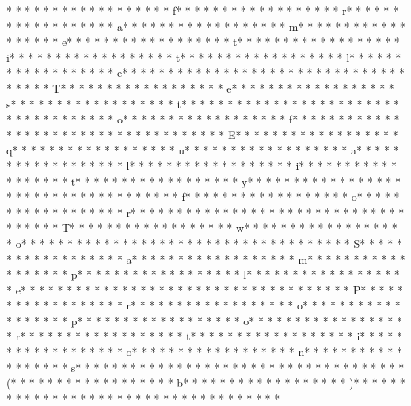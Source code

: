* * *  * * *  * * *  *  * * *  *  * * *  * f* * *  * * *  * * *  *  * * *  *  * * *  * r* * *  * * *  * * *  *  * * *  *  * * *  * a* * *  * * *  * * *  *  * * *  *  * * *  * m* * *  * * *  * * *  *  * * *  *  * * *  * e* * *  * * *  * * *  *  * * *  *  * * *  * t* * *  * * *  * * *  *  * * *  *  * * *  * i* * *  * * *  * * *  *  * * *  *  * * *  * t* * *  * * *  * * *  *  * * *  *  * * *  * l* * *  * * *  * * *  *  * * *  *  * * *  * e* * *  * * *  * * *  *  * * *  *  * * *  * {* * *  * * *  * * *  *  * * *  *  * * *  * T* * *  * * *  * * *  *  * * *  *  * * *  * e* * *  * * *  * * *  *  * * *  *  * * *  * s* * *  * * *  * * *  *  * * *  *  * * *  * t* * *  * * *  * * *  *  * * *  *  * * *  *  * * *  * * *  * * *  *  * * *  *  * * *  * o* * *  * * *  * * *  *  * * *  *  * * *  * f* * *  * * *  * * *  *  * * *  *  * * *  *  * * *  * * *  * * *  *  * * *  *  * * *  * E* * *  * * *  * * *  *  * * *  *  * * *  * q* * *  * * *  * * *  *  * * *  *  * * *  * u* * *  * * *  * * *  *  * * *  *  * * *  * a* * *  * * *  * * *  *  * * *  *  * * *  * l* * *  * * *  * * *  *  * * *  *  * * *  * i* * *  * * *  * * *  *  * * *  *  * * *  * t* * *  * * *  * * *  *  * * *  *  * * *  * y* * *  * * *  * * *  *  * * *  *  * * *  *  * * *  * * *  * * *  *  * * *  *  * * *  * f* * *  * * *  * * *  *  * * *  *  * * *  * o* * *  * * *  * * *  *  * * *  *  * * *  * r* * *  * * *  * * *  *  * * *  *  * * *  *  * * *  * * *  * * *  *  * * *  *  * * *  * T* * *  * * *  * * *  *  * * *  *  * * *  * w* * *  * * *  * * *  *  * * *  *  * * *  * o* * *  * * *  * * *  *  * * *  *  * * *  *  * * *  * * *  * * *  *  * * *  *  * * *  * S* * *  * * *  * * *  *  * * *  *  * * *  * a* * *  * * *  * * *  *  * * *  *  * * *  * m* * *  * * *  * * *  *  * * *  *  * * *  * p* * *  * * *  * * *  *  * * *  *  * * *  * l* * *  * * *  * * *  *  * * *  *  * * *  * e* * *  * * *  * * *  *  * * *  *  * * *  *  * * *  * * *  * * *  *  * * *  *  * * *  * P* * *  * * *  * * *  *  * * *  *  * * *  * r* * *  * * *  * * *  *  * * *  *  * * *  * o* * *  * * *  * * *  *  * * *  *  * * *  * p* * *  * * *  * * *  *  * * *  *  * * *  * o* * *  * * *  * * *  *  * * *  *  * * *  * r* * *  * * *  * * *  *  * * *  *  * * *  * t* * *  * * *  * * *  *  * * *  *  * * *  * i* * *  * * *  * * *  *  * * *  *  * * *  * o* * *  * * *  * * *  *  * * *  *  * * *  * n* * *  * * *  * * *  *  * * *  *  * * *  * s* * *  * * *  * * *  *  * * *  *  * * *  *  * * *  * * *  * * *  *  * * *  *  * * *  * (* * *  * * *  * * *  *  * * *  *  * * *  * b* * *  * * *  * * *  *  * * *  *  * * *  * )* * *  * * *  * * *  *  * * *  *  * * *  * }* * *  * * *  * * *  *  * * *  *  * * *  * 
